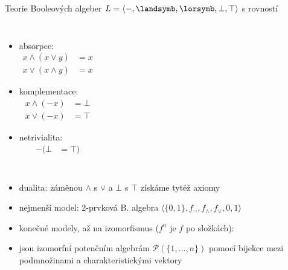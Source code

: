 \documentclass{beamer}
\begin{document}
\begin{frame}{Teorie Booleových algeber \hfill $L=\langle -,\landsymb,\lorsymb,\bot,\top\rangle$ s rovností}
{\begin{columns}
        \begin{itemize}
            \item \alert{absorpce}:
            \vspace{-9pt}\begin{align*}
                x\land(x\lor y) &= x\\
                x\lor(x\land y) &= x
            \end{align*}\vspace{-24pt}
            \item \alert{komplementace}:
            \vspace{-9pt}\begin{align*}
                x\land(-x) &= \bot \\
                x\lor(-x) &= \top
            \end{align*}\vspace{-24pt}
            \item \alert{netrivialita}:
            \vspace{-9pt}\begin{align*}
                -(\bot &= \top)
            \end{align*}
        \end{itemize}
                

    \end{columns}
    \vspace{9pt}
    }

    \pause
    \begin{itemize}
        \item dualita: záměnou $\land$ s $\lor$ a $\bot$ s $\top$ získáme tytéž axiomy \pause   
        \item nejmenší model: \alert{2-prvková B. algebra} $\langle \{0,1\},f_\neg,f_\land,f_\lor,0,1\rangle$\pause
        \item konečné modely, až na \alert{izomorfismus} ($f^n$ je $f$ po složkách):
        
        \pause
        \item jsou izomorfní \alert{potenčním algebrám} $\mathcal P(\{1,\dots,n\})$ pomocí bijekce mezi podmnožinami a  charakteristickými vektory
    \end{itemize}
    
\end{frame}
\end{document}
